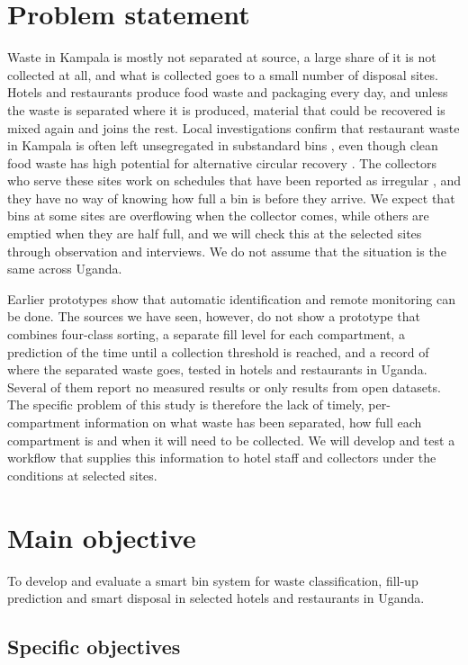 \documentclass[12pt,a4paper]{report}
\begin{document}
\section{Problem statement}

Waste in Kampala is mostly not separated at source, a large share of it is not collected at all, and what is collected goes to a small number of disposal sites. Hotels and restaurants produce food waste and packaging every day, and unless the waste is separated where it is produced, material that could be recovered is mixed again and joins the rest. Local investigations confirm that restaurant waste in Kampala is often left unsegregated in substandard bins \cite{walina}, even though clean food waste has high potential for alternative circular recovery \cite{ssepuuya}. The collectors who serve these sites work on schedules that have been reported as irregular \cite{mwesigwa}, and they have no way of knowing how full a bin is before they arrive. We expect that bins at some sites are overflowing when the collector comes, while others are emptied when they are half full, and we will check this at the selected sites through observation and interviews. We do not assume that the situation is the same across Uganda.

Earlier prototypes show that automatic identification and remote monitoring can be done. The sources we have seen, however, do not show a prototype that combines four-class sorting, a separate fill level for each compartment, a prediction of the time until a collection threshold is reached, and a record of where the separated waste goes, tested in hotels and restaurants in Uganda. Several of them report no measured results or only results from open datasets. The specific problem of this study is therefore the lack of timely, per-compartment information on what waste has been separated, how full each compartment is and when it will need to be collected. We will develop and test a workflow that supplies this information to hotel staff and collectors under the conditions at selected sites.

\section{Main objective}

To develop and evaluate a smart bin system for waste classification, fill-up prediction and smart disposal in selected hotels and restaurants in Uganda.

\subsection{Specific objectives}
\end{document}
